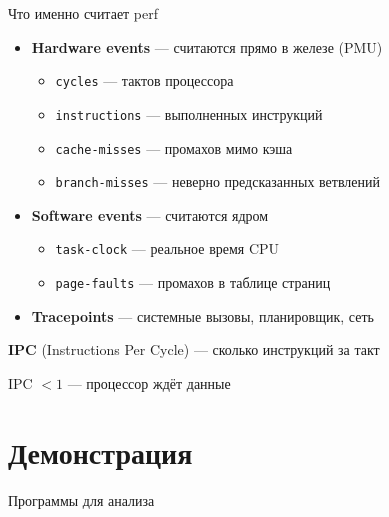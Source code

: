 \documentclass[aspectratio=169, russian]{beamer}
\begin{document}
\begin{frame}{Что именно считает perf}
    \begin{itemize}
        \item \textbf{Hardware events} --- считаются прямо в железе (PMU)
              \begin{itemize}
                  \item \texttt{cycles} --- тактов процессора
                  \item \texttt{instructions} --- выполненных инструкций
                  \item \texttt{cache-misses} --- промахов мимо кэша
                  \item \texttt{branch-misses} --- неверно предсказанных ветвлений
              \end{itemize}

              \bigskip
        \item \textbf{Software events} --- считаются ядром
              \begin{itemize}
                  \item \texttt{task-clock} --- реальное время CPU
                  \item \texttt{page-faults} --- промахов в таблице страниц
              \end{itemize}

              \bigskip
        \item \textbf{Tracepoints} --- системные вызовы, планировщик, сеть
    \end{itemize}

    \bigskip

    \textbf{IPC} (Instructions Per Cycle) --- сколько инструкций за такт

    IPC $< 1$ --- процессор ждёт данные
\end{frame}

\section{Демонстрация}

\begin{frame}[fragile]{Программы для анализа}
    \begin{columns}[T]
        \inputminted[]{c}{row.c}
        \inputminted[]{c}{col.c}
    \end{columns}
\end{frame}
\end{document}
